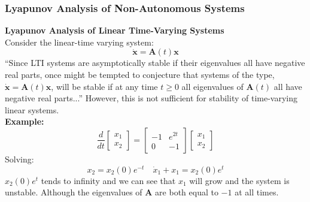\documentclass[11pt,handout]{beamer}   %
\begin{document}
\begin{frame}
\frametitle{Lyapunov Analysis of Non-Autonomous Systems}
\small
\textbf{Lyapunov Analysis of Linear Time-Varying Systems}\\
\vspace{6pt}
Consider the linear-time varying system:
\begin{equation*}
\mathbf{\dot{x}} = \mathbf{A}(t) \mathbf{x}
\end{equation*}
``Since LTI systems are asymptotically stable if their eigenvalues all have negative real parts, once might be tempted to conjecture that systems of the type, $\mathbf{\dot{x}} = \mathbf{A}(t)\mathbf{x}$, will be stable if at any time $t \geq 0 $ all eigenvalues of $\mathbf{A}(t)$ all have negative real parts...'' However, this is not sufficient for stability of time-varying linear systems.\\
\textbf{Example:}
\begin{equation*}
\frac{d}{dt}\begin{bmatrix}
x_1 \\ x_2
\end{bmatrix} = \begin{bmatrix}
-1 & e^{2t} \\ 0 & -1
\end{bmatrix} \begin{bmatrix}
x_1 \\ x_2
\end{bmatrix}
\end{equation*}
Solving:
\begin{equation*}
x_2 = x_2(0) e^{-t} \quad \dot{x}_1 + x_1 = x_2(0)e^t
\end{equation*}
$x_2(0) e^t$ tends to infinity and we can see that $x_1$ will grow and the system is unstable. Although the eigenvalues of $\mathbf{A}$ are both equal to $-1$ at all times.\\
\textbf{}
\end{frame}
\end{document}
